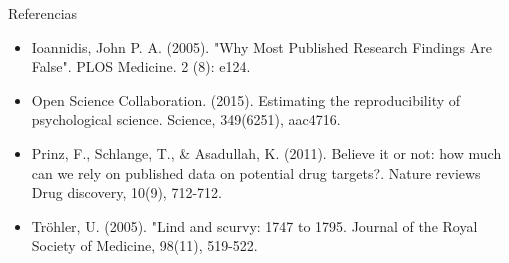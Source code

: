 ﻿\documentclass{beamer}
\begin{document}
\begin{frame}{Referencias}

   \begin{itemize}
        \item Ioannidis, John P. A. (2005). "Why Most Published Research Findings Are False". PLOS Medicine. 2 (8): e124.
        \item Open Science Collaboration. (2015). Estimating the reproducibility of psychological science. Science, 349(6251), aac4716.
        \item Prinz, F., Schlange, T., \& Asadullah, K. (2011). Believe it or not: how much can we rely on published data on potential drug targets?. Nature reviews Drug discovery, 10(9), 712-712.
        \item Tröhler, U. (2005). "Lind and scurvy: 1747 to 1795. Journal of the Royal Society of Medicine, 98(11), 519-522.  
   \end{itemize}
   
\end{frame}
\end{document}
